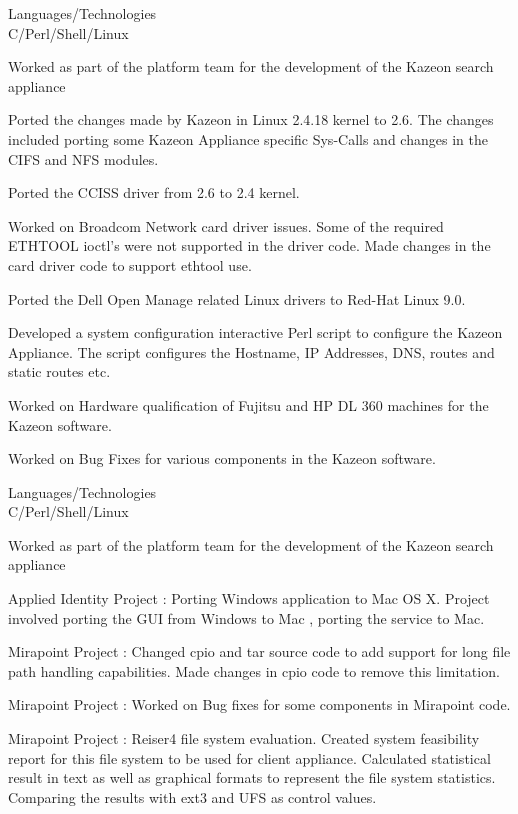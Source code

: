 \documentclass[a4,11pt]{cv4tw}
\begin{document}
{Languages/Technologies \\ C/Perl/Shell/Linux}
	{ 
	\begin{missions}		
		\item Worked as part of the platform team for the development of the Kazeon search appliance
		\item Ported the changes made by Kazeon in Linux 2.4.18 kernel to 2.6. The changes included porting some Kazeon Appliance specific Sys-Calls and changes in the CIFS and NFS modules.
		\item Ported the CCISS driver from 2.6 to 2.4 kernel.
		\item Worked on Broadcom Network card driver issues. Some of the required ETHTOOL ioctl's were not supported in the driver code. Made changes in the card driver code to support ethtool use.
		\item Ported the Dell Open Manage related Linux drivers to Red-Hat Linux 9.0.
		\item Developed a  system configuration interactive Perl script to configure the Kazeon Appliance. The script configures the Hostname, IP Addresses, DNS, routes and static routes etc.
		\item Worked on Hardware qualification of Fujitsu and HP DL 360 machines for the Kazeon software.
		\item Worked on Bug Fixes for various components in the Kazeon software.	
	\end{missions}
}

{Languages/Technologies \\ C/Perl/Shell/Linux}
	{ 
	\begin{missions}		
		\item Worked as part of the platform team for the development of the Kazeon search appliance
		\item Applied Identity Project : Porting Windows application to Mac OS X. Project involved porting the GUI from Windows to Mac , porting the service to Mac.
		\item Mirapoint Project : Changed cpio and tar source code to add support for long file path handling capabilities. Made changes in cpio code to remove this limitation.
		\item Mirapoint Project : Worked on Bug fixes for some components in Mirapoint code.
		\item Mirapoint Project : Reiser4 file system evaluation. Created system feasibility report for this file system to be used for client appliance. Calculated statistical result in text as well as graphical formats to represent the file system statistics. Comparing the results with ext3 and UFS as control values.
	\end{missions}
}
\end{document}
